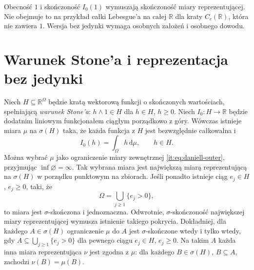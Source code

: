 \begin{uwaga}
Obecność $1$ i skończoność $I_0(1)$ wymuszają
skończoność miary reprezentującej. Nie obejmuje to
na przykład całki Lebesgue'a na całej $\mathbb{R}$ dla kraty
$C_c(\mathbb{R})$, która nie zawiera $1$. Wersja bez jedynki
wymaga osobnych założeń i osobnego dowodu.
\end{uwaga}

\section{Warunek Stone'a i reprezentacja bez jedynki}

\begin{twierdzenie}
\label{it:thm:daniell-stone-general}
Niech $H\subseteq\mathbb{R}^\Omega$ będzie kratą wektorową
funkcji o skończonych wartościach, spełniającą
\emph{warunek Stone'a}: $h\wedge1\in H$ dla $h\in H$,
$h\ge0$. Niech $I_0:H\to\mathbb{R}$ będzie dodatnim
liniowym funkcjonałem ciągłym porządkowo z góry.
Wówczas istnieje miara $\mu$ na $\sigma(H)$ taka, że
każda funkcja z $H$ jest bezwzględnie całkowalna i
\[
 I_0(h)=\int_\Omega h\,\mathrm d\mu,\qquad h\in H.
\]
Można wybrać $\mu$ jako ograniczenie miary zewnętrznej
\eqref{it:eq:daniell-outer}, przyjmując $\inf\varnothing=\infty$.
Tak wybrana miara jest największą miarą reprezentującą
na $\sigma(H)$ w porządku punktowym na zbiorach.
Jeśli ponadto istnieje ciąg $e_j\in H$, $e_j\ge0$, taki, że
\[
 \Omega=\bigcup_{j\ge1}\{e_j>0\},
\]
to miara jest $\sigma$-skończona i jednoznaczna.
Odwrotnie, $\sigma$-skończoność największej miary
reprezentującej wymusza istnienie takiego pokrycia.
Dokładniej, dla każdego $A\in\sigma(H)$ ograniczenie
$\mu$ do $A$ jest $\sigma$-skończone wtedy i tylko wtedy,
gdy $A\subseteq\bigcup_{j\ge1}\{e_j>0\}$ dla pewnego
ciągu $e_j\in H$, $e_j\ge0$. Na takim $A$ każda
inna miara reprezentująca $\nu$ jest zgodna z $\mu$:
dla każdego $B\in\sigma(H)$, $B\subseteq A$, zachodzi
$\nu(B)=\mu(B)$.
\end{twierdzenie}
